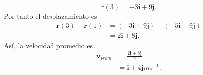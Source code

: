 \documentclass[12pt,a4paper]{article}
\begin{document}
\begin{solucion}
\begin{enumerate}
\begin{equation*}
                \textbf{r}(3)=-3\textbf{i}+9\textbf{j}.
            \end{equation*}
            Por tanto el desplazamiento es
            \begin{align*}
                \textbf{r}(3)-\textbf{r}(1)&=(-3\textbf{i}+9\textbf{j})-(-5\textbf{i}+9\textbf{j})\\
                &=2\textbf{i}+8\textbf{j}.
            \end{align*}
            Así, la velocidad promedio es
            \begin{align*}
                \textbf{v}_{prom}&=\frac{2\textbf{i}+8\textbf{j}}{2}\\
                &=\textbf{i}+4\textbf{j}ms^{-1}.
            \end{align*}
        \end{enumerate}
    \end{solucion}
\end{document}
